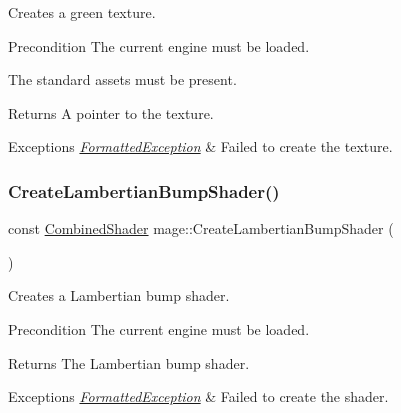 Creates a green texture.

\begin{DoxyPrecond}{Precondition}
The current engine must be loaded. 

The standard assets must be present. 
\end{DoxyPrecond}
\begin{DoxyReturn}{Returns}
A pointer to the texture. 
\end{DoxyReturn}

\begin{DoxyExceptions}{Exceptions}
{\em \hyperlink{structmage_1_1_formatted_exception}{Formatted\+Exception}} & Failed to create the texture. \\
\hline
\end{DoxyExceptions}
\hypertarget{namespacemage_a42f5f6976641c7fd9a37077eab99cd40}{}\label{namespacemage_a42f5f6976641c7fd9a37077eab99cd40} 
\subsubsection{\texorpdfstring{Create\+Lambertian\+Bump\+Shader()}{CreateLambertianBumpShader()}}
{\footnotesize\ttfamily const \hyperlink{structmage_1_1_combined_shader}{Combined\+Shader} mage\+::\+Create\+Lambertian\+Bump\+Shader (\begin{DoxyParamCaption}{ }\end{DoxyParamCaption})}

Creates a Lambertian bump shader.

\begin{DoxyPrecond}{Precondition}
The current engine must be loaded. 
\end{DoxyPrecond}
\begin{DoxyReturn}{Returns}
The Lambertian bump shader. 
\end{DoxyReturn}

\begin{DoxyExceptions}{Exceptions}
{\em \hyperlink{structmage_1_1_formatted_exception}{Formatted\+Exception}} & Failed to create the shader. \\
\hline
\end{DoxyExceptions}
\hypertarget{namespacemage_a91a20907d6a7a77bdd768dbd0bc420c5}{}\label{namespacemage_a91a20907d6a7a77bdd768dbd0bc420c5} 
